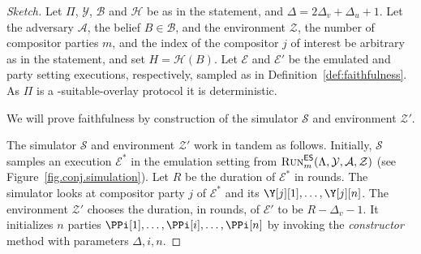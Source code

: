 \begin{proof}[Sketch]
  Let $\Pi$, $\mathcal{Y}$, $\mathcal{B}$ and $\mathcal{H}$
  be as in the statement, and $\Delta =  2 \Delta_v + \Delta_u + 1$.
  Let the adversary $\mathcal{A}$, the belief $B \in \mathcal{B}$,
  and the environment $\mathcal{Z}$, the number of compositor parties $m$,
  and the index of the compositor $j$ of interest be arbitrary
  as in the statement, and set $H = \mathcal{H}(B)$.
  Let $\mathcal{E}$ and $\mathcal{E}'$ be the emulated and party setting
  executions, respectively, sampled as in Definition~\ref{def:faithfulness}.
  As $\Pi$ is a \rollerblade-suitable-overlay protocol it is deterministic.

  We will prove faithfulness by
  construction of the simulator $\mathcal{S}$ and environment $\mathcal{Z}'$.

  The simulator $\mathcal{S}$ and environment $\mathcal{Z}'$ work in tandem
  as follows.
  Initially, $\mathcal{S}$ samples an execution
  $\mathcal{E}^*$ in the emulation setting from
  $\textsc{Run}^{\textsf{ES}}_m(\Lambda,\allowbreak\mathcal{Y},\allowbreak\mathcal{A},\allowbreak\mathcal{Z})$
  (see Figure~\ref{fig.conj.simulation}).
  Let $R$ be the duration of $\mathcal{E}^*$ in rounds.
  The simulator looks at compositor party $j$ of $\mathcal{E}^*$
  and its $\Y[j][1], \ldots, \Y[j][n]$.
  The environment $\mathcal{Z}'$ chooses the duration, in rounds, of
  $\mathcal{E}'$ to be $R - \Delta_v - 1$. It initializes $n$
  parties $\PPi[1], \ldots, \PPi[i], \ldots, \PPi[n]$ by invoking
  the \emph{constructor} method with parameters $\Delta, i, n$.


\end{proof}
